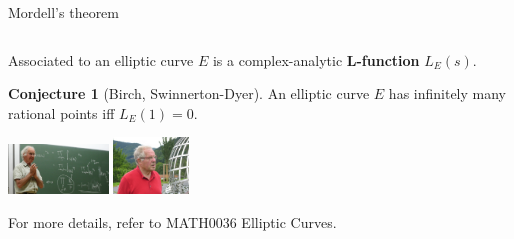 \documentclass[10pt]{beamer}
\theoremstyle{definition}
\newtheorem{conjecture}{Conjecture}
\begin{document}
\begin{frame}[t]{Mordell's theorem}
\begin{columns}[T]
\end{columns}

\vspace{0.5cm} Associated to an elliptic curve $ E $ is a complex-analytic \textbf{L-function} $ L_E(s) $.

\begin{conjecture}[Birch, Swinnerton-Dyer]
An elliptic curve $ E $ has infinitely many rational points iff $ L_E(1) = 0 $.
\end{conjecture}

\begin{center}
\includegraphics[width=0.2\textwidth]{birch.jpg}
\hspace{0.5cm}
\includegraphics[width=0.15\textwidth]{swinnertondyer.jpg}
\end{center}
For more details, refer to MATH0036 Elliptic Curves.

\end{frame}
\end{document}
